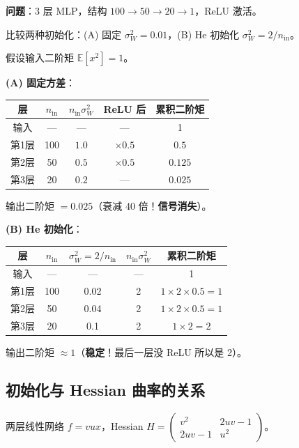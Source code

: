 \documentclass[12pt, a4paper]{ctexart}
\begin{document}
\textbf{问题}：3 层 MLP，结构 $100 \to 50 \to 20 \to 1$，ReLU 激活。

比较两种初始化：(A) 固定 $\sigma_W^2 = 0.01$，(B) He 初始化 $\sigma_W^2 = 2/n_{\text{in}}$。

假设输入二阶矩 $\mathbb{E}[x^2] = 1$。

\textbf{(A) 固定方差}：

\begin{center}
\begin{tabular}{c|cccc}
层 & $n_{\text{in}}$ & $n_{\text{in}}\sigma_W^2$ & ReLU 后 & 累积二阶矩 \\
\hline
输入 & — & — & — & 1 \\
第1层 & 100 & $1.0$ & $\times 0.5$ & $0.5$ \\
第2层 & 50 & $0.5$ & $\times 0.5$ & $0.125$ \\
第3层 & 20 & $0.2$ & — & $0.025$ \\
\end{tabular}
\end{center}

输出二阶矩 $= 0.025$（衰减 40 倍！\textbf{信号消失}）。

\textbf{(B) He 初始化}：

\begin{center}
\begin{tabular}{c|cccc}
层 & $n_{\text{in}}$ & $\sigma_W^2 = 2/n_{\text{in}}$ & $n_{\text{in}}\sigma_W^2$ & 累积二阶矩 \\
\hline
输入 & — & — & — & 1 \\
第1层 & 100 & 0.02 & 2 & $1\times 2\times 0.5 = 1$ \\
第2层 & 50 & 0.04 & 2 & $1\times 2\times 0.5 = 1$ \\
第3层 & 20 & 0.1 & 2 & $1\times 2 = 2$ \\
\end{tabular}
\end{center}

输出二阶矩 $\approx 1$（\textbf{稳定}！最后一层没 ReLU 所以是 2）。

\subsection{初始化与 Hessian 曲率的关系}

两层线性网络 $f = vux$，Hessian $H = \begin{pmatrix} v^2 & 2uv-1 \\ 2uv-1 & u^2 \end{pmatrix}$。
\end{document}
